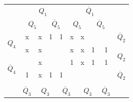 \documentclass[a4paper,14pt]{article}
\begin{document}
\begin{table}[H]
	\begin{minipage}{.5\linewidth}
		\centering
\begin{tabular}{cccccccccc}
	& \multicolumn{4}{c}{$Q_1$}                                                                         & \multicolumn{4}{c}{$\overline{Q}_1$}                                                              &                        \\
	& \multicolumn{2}{c}{$Q_5$}                       & \multicolumn{2}{c}{$\overline{Q}_5$}            & \multicolumn{2}{c}{$Q_5$}                       & \multicolumn{2}{c}{$\overline{Q}_5$}            &                        \\ \cline{2-9}
	\multicolumn{1}{c|}{\multirow{2}{*}{$Q_4$}}            & \multicolumn{1}{c|}{x} & \multicolumn{1}{c|}{x} & \multicolumn{1}{c|}{1} & \multicolumn{1}{c|}{1} & \multicolumn{1}{c|}{x} & \multicolumn{1}{c|}{x} & \multicolumn{1}{c|}{}  & \multicolumn{1}{c|}{}  & $\overline{Q}_2$       \\ \cline{2-9}
	\multicolumn{1}{c|}{}                                  & \multicolumn{1}{c|}{x} & \multicolumn{1}{c|}{x} & \multicolumn{1}{c|}{}  & \multicolumn{1}{c|}{}  & \multicolumn{1}{c|}{x} & \multicolumn{1}{c|}{x} & \multicolumn{1}{c|}{1} & \multicolumn{1}{c|}{1} & \multirow{2}{*}{$Q_2$} \\ \cline{2-9}
	\multicolumn{1}{c|}{\multirow{2}{*}{$\overline{Q}_4$}} & \multicolumn{1}{c|}{}  & \multicolumn{1}{c|}{x} & \multicolumn{1}{c|}{}  & \multicolumn{1}{c|}{}  & \multicolumn{1}{c|}{1} & \multicolumn{1}{c|}{x} & \multicolumn{1}{c|}{1} & \multicolumn{1}{c|}{1} &                        \\ \cline{2-9}
	\multicolumn{1}{c|}{}                                  & \multicolumn{1}{c|}{1} & \multicolumn{1}{c|}{x} & \multicolumn{1}{c|}{1} & \multicolumn{1}{c|}{1} & \multicolumn{1}{c|}{}  & \multicolumn{1}{c|}{}  & \multicolumn{1}{c|}{}  & \multicolumn{1}{c|}{}  & $\overline{Q}_2$       \\ \cline{2-9}
	&                        & \multicolumn{2}{c}{}                            & \multicolumn{2}{c}{}                            & \multicolumn{2}{c}{}                            &                        &                        \\
	& $\overline{Q}_3$       & \multicolumn{2}{c}{$Q_3$}                       & \multicolumn{2}{c}{$\overline{Q}_3$}            & \multicolumn{2}{c}{$Q_3$}                       & $\overline{Q}_3$       &                       

\end{tabular}
\end{minipage}
\end{table}
\end{document}
